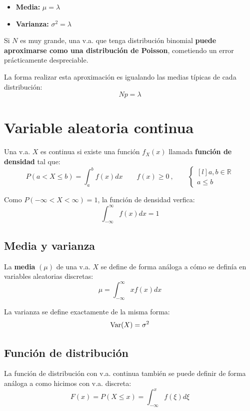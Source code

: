 \documentclass[a4paper]{book}
\begin{document}
\begin{itemize}
	\item \textbf{Media:} $\displaystyle{\mu = \lambda}$
	\item \textbf{Varianza:} $\displaystyle{\sigma ^2 = \lambda}$
\end{itemize}

\begin{nota}

	Si $N$ es muy grande, una v.a. que tenga distribución binomial \textbf{puede aproximarse como una distribución de Poisson}, cometiendo un error prácticamente despreciable.

	La forma realizar esta aproximación es igualando las medias típicas de cada distribución: \[Np = \lambda\]
\end{nota}

\section{Variable aleatoria continua}
Una v.a. $X$ es continua si existe una función $f_X(x)$ llamada \textbf{función de densidad} tal que: \[\boxed{P\left( a<X\leq b \right) = \int_a^b{f(x)dx}} \qquad  f(x) \geq 0\: ,\qquad
	\left\{ \begin{matrix*}[l]
		a,b\in \mathbb{R}\\
		a\leq b
	\end{matrix*}\right. \]

\begin{nota}
	Como $P\left( -\infty < X < \infty \right) = 1$, la función de densidad verfica: \[\int_{-\infty}^{\infty}{f(x)dx} = 1\]
\end{nota}

\subsection{Media y varianza}
La \textbf{media} $(\mu)$ de una v.a. $X$ se define de forma análoga a cómo se definía en variables aleatorias discretas: \[\mu = \int_{-\infty}^{\infty}{x f(x) dx}\]

La varianza se define exactamente de la misma forma: \[\operatorname{Var}(X) = \sigma ^2\]

\subsection{Función de distribución}
La función de distribución con v.a. continua también se puede definir de forma análoga a como hicimos con v.a. discreta: \[\boxed{F(x) = P\left( X\leq x \right) = \int_{-\infty}^x{f(\xi )d\xi}}\]
\end{document}
